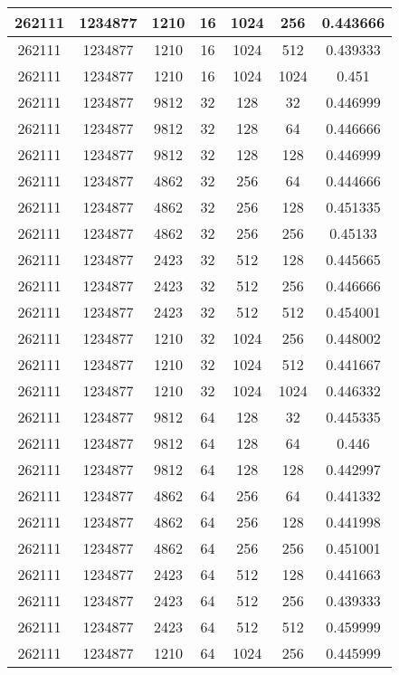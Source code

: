 \documentclass[9pt]{article}
\begin{document}
\begin{tabular}{|c|c|c|c|c|c|c| }
\hline
262111  & 1234877  & 1210  & 16  & 1024  & 256  & 0.443666 \\
\hline
262111  & 1234877  & 1210  & 16  & 1024  & 512  & 0.439333 \\
\hline
262111  & 1234877  & 1210  & 16  & 1024  & 1024  & 0.451 \\
\hline
262111  & 1234877  & 9812  & 32  & 128  & 32  & 0.446999 \\
\hline
262111  & 1234877  & 9812  & 32  & 128  & 64  & 0.446666 \\
\hline
262111  & 1234877  & 9812  & 32  & 128  & 128  & 0.446999 \\
\hline
262111  & 1234877  & 4862  & 32  & 256  & 64  & 0.444666 \\
\hline
262111  & 1234877  & 4862  & 32  & 256  & 128  & 0.451335 \\
\hline
262111  & 1234877  & 4862  & 32  & 256  & 256  & 0.45133 \\
\hline
262111  & 1234877  & 2423  & 32  & 512  & 128  & 0.445665 \\
\hline
262111  & 1234877  & 2423  & 32  & 512  & 256  & 0.446666 \\
\hline
262111  & 1234877  & 2423  & 32  & 512  & 512  & 0.454001 \\
\hline
262111  & 1234877  & 1210  & 32  & 1024  & 256  & 0.448002 \\
\hline
262111  & 1234877  & 1210  & 32  & 1024  & 512  & 0.441667 \\
\hline
262111  & 1234877  & 1210  & 32  & 1024  & 1024  & 0.446332 \\
\hline
262111  & 1234877  & 9812  & 64  & 128  & 32  & 0.445335 \\
\hline
262111  & 1234877  & 9812  & 64  & 128  & 64  & 0.446 \\
\hline
262111  & 1234877  & 9812  & 64  & 128  & 128  & 0.442997 \\
\hline
262111  & 1234877  & 4862  & 64  & 256  & 64  & 0.441332 \\
\hline
262111  & 1234877  & 4862  & 64  & 256  & 128  & 0.441998 \\
\hline
262111  & 1234877  & 4862  & 64  & 256  & 256  & 0.451001 \\
\hline
262111  & 1234877  & 2423  & 64  & 512  & 128  & 0.441663 \\
\hline
262111  & 1234877  & 2423  & 64  & 512  & 256  & 0.439333 \\
\hline
262111  & 1234877  & 2423  & 64  & 512  & 512  & 0.459999 \\
\hline
262111  & 1234877  & 1210  & 64  & 1024  & 256  & 0.445999 \\

\end{tabular}
\end{document}
